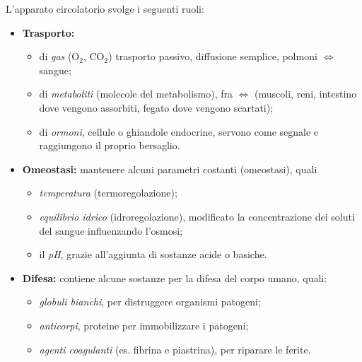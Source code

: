 \documentclass[a4paper]{article}
\begin{document}
L'apparato circolatorio svolge i seguenti ruoli:
\begin{itemize}
    \item \textbf{Trasporto:} 
    \begin{itemize}
        \item di \textit{gas} (O\({}_2\), CO\({}_2\)) trasporto passivo, diffusione semplice, polmoni \(\iff\) sangue;
        \item di \textit{metaboliti} (molecole del metabolismo), fra \(\iff\) (muscoli, reni, intestino dove vengono assorbiti, fegato dove vengono scartati);
        \item di \textit{ormoni}, cellule o ghiandole endocrine, servono come segnale e raggiungono il proprio bersaglio. %
    \end{itemize}
    \item \textbf{Omeostasi:} mantenere alcuni parametri costanti (omeostasi), quali
        \begin{itemize}
            \item \textit{temperatura} (termoregolazione);
            \item \textit{equilibrio idrico} (idroregolazione), modificato la concentrazione dei soluti del sangue influenzando l'osmosi;
            \item il \textit{pH}, grazie all'aggiunta di sostanze acide o basiche.
        \end{itemize}
    \item \textbf{Difesa:} contiene alcune sostanze per la difesa del corpo umano, quali:
        \begin{itemize}
            \item \textit{globuli bianchi}, per distruggere organismi patogeni;
            \item \textit{anticorpi}, proteine per immobilizzare i patogeni;
            \item \textit{agenti coagulanti} (es. fibrina e piastrina), per riparare le ferite.
        \end{itemize}
\end{itemize}
\end{document}
